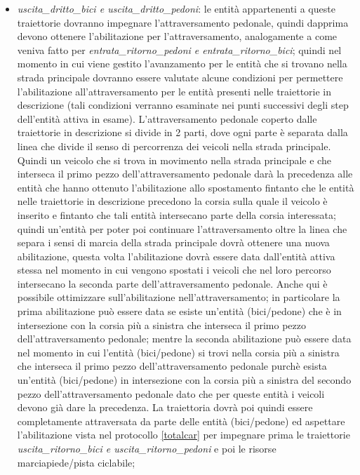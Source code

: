 \begin{enumerate}
\begin{enumerate}
\begin{itemize}
\item \textit{usci\-ta\_drit\-to\_bi\-ci e usci\-ta\_drit\-to\_pe\-do\-ni}: le
entità appartenenti a queste traiettorie dovranno impegnare l'attraversamento pedonale, quindi dapprima devono ottenere l'abilitazione per l'attraversamento, analogamente a come veniva fatto per \textit{en\-tra\-ta\_ri\-tor\-no\_pe\-do\-ni e en\-tra\-ta\_ri\-tor\-no\_bi\-ci}; quindi nel momento in cui viene gestito l'avanzamento per le entità che si trovano nella strada principale dovranno essere valutate alcune condizioni per permettere l'abilitazione all'attraversamento per le entità presenti nelle traiettorie in descrizione (tali condizioni verranno esaminate nei punti successivi degli step dell'entità attiva in esame). L'attraversamento pedonale coperto dalle traiettorie in descrizione si divide in 2 parti, dove ogni parte è separata dalla linea che divide il senso di percorrenza dei veicoli nella strada principale. Quindi un veicolo che si trova in movimento nella strada principale e che interseca il primo pezzo dell'attraversamento pedonale darà la precedenza alle entità che hanno ottenuto l'abilitazione allo spostamento fintanto che le entità nelle traiettorie in descrizione precedono la corsia sulla quale il veicolo è inserito e fintanto che tali entità intersecano parte della corsia interessata; quindi un'entità per poter poi continuare l'attraversamento oltre la linea che separa i sensi di marcia della strada principale dovrà ottenere una nuova abilitazione, questa volta l'abilitazione dovrà essere data dall'entità attiva stessa nel momento in cui vengono spostati i veicoli che nel loro percorso intersecano la seconda parte dell'attraversamento pedonale. Anche qui è possibile ottimizzare sull'abilitazione nell'attraversamento; in particolare la prima abilitazione può essere data se esiste un'entità (bici/pedone) che è in intersezione con la corsia più a sinistra che interseca il primo pezzo dell'attraversamento pedonale; mentre la seconda abilitazione può essere data nel momento in cui l'entità (bici/pedone) si trovi nella corsia più a sinistra che interseca il primo pezzo dell'attraversamento pedonale purchè esista un'entità (bici/pedone) in intersezione con la corsia più a sinistra del secondo pezzo dell'attraversamento pedonale dato che per queste entità i veicoli devono già dare la precedenza. La traiettoria dovrà poi quindi essere completamente attraversata da parte delle entità (bici/pedone) ed aspettare l'abilitazione vista nel protocollo \ref{totalcar} per impegnare prima le traiettorie \textit{usci\-ta\_ri\-tor\-no\_bi\-ci e usci\-ta\_ri\-tor\-no\_pe\-do\-ni} e poi le risorse marciapiede/pista ciclabile;

\end{itemize}
\end{enumerate}
\end{enumerate}
